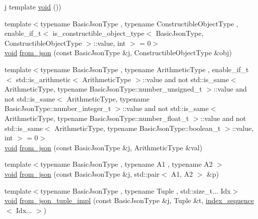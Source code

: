 \begin{DoxyCompactItemize}
\item 
j template \mbox{\hyperlink{namespacenlohmann_1_1detail_a59fca69799f6b9e366710cb9043aa77d}{void}} ())
\item 
{\footnotesize template$<$typename Basic\+Json\+Type , typename Constructible\+Object\+Type , enable\+\_\+if\+\_\+t$<$ is\+\_\+constructible\+\_\+object\+\_\+type$<$ Basic\+Json\+Type, Constructible\+Object\+Type $>$\+::value, int $>$  = 0$>$ }\\\mbox{\hyperlink{namespacenlohmann_1_1detail_a59fca69799f6b9e366710cb9043aa77d}{void}} \mbox{\hyperlink{namespacenlohmann_1_1detail_a5b24896e5f5db6af06d939dde4b63fe1}{from\+\_\+json}} (const Basic\+Json\+Type \&j, Constructible\+Object\+Type \&obj)
\item 
{\footnotesize template$<$typename Basic\+Json\+Type , typename Arithmetic\+Type , enable\+\_\+if\+\_\+t$<$ std\+::is\+\_\+arithmetic$<$ Arithmetic\+Type $>$\+::value and not std\+::is\+\_\+same$<$ Arithmetic\+Type, typename Basic\+Json\+Type\+::number\+\_\+unsigned\+\_\+t $>$\+::value and not std\+::is\+\_\+same$<$ Arithmetic\+Type, typename Basic\+Json\+Type\+::number\+\_\+integer\+\_\+t $>$\+::value and not std\+::is\+\_\+same$<$ Arithmetic\+Type, typename Basic\+Json\+Type\+::number\+\_\+float\+\_\+t $>$\+::value and not std\+::is\+\_\+same$<$ Arithmetic\+Type, typename Basic\+Json\+Type\+::boolean\+\_\+t $>$\+::value, int $>$  = 0$>$ }\\\mbox{\hyperlink{namespacenlohmann_1_1detail_a59fca69799f6b9e366710cb9043aa77d}{void}} \mbox{\hyperlink{namespacenlohmann_1_1detail_a839b0ab50d2c9bce669068f56bc41202}{from\+\_\+json}} (const Basic\+Json\+Type \&j, Arithmetic\+Type \&val)
\item 
{\footnotesize template$<$typename Basic\+Json\+Type , typename A1 , typename A2 $>$ }\\\mbox{\hyperlink{namespacenlohmann_1_1detail_a59fca69799f6b9e366710cb9043aa77d}{void}} \mbox{\hyperlink{namespacenlohmann_1_1detail_aae9f9c2601074e323d49428132cc293d}{from\+\_\+json}} (const Basic\+Json\+Type \&j, std\+::pair$<$ A1, A2 $>$ \&p)
\item 
{\footnotesize template$<$typename Basic\+Json\+Type , typename Tuple , std\+::size\+\_\+t... Idx$>$ }\\\mbox{\hyperlink{namespacenlohmann_1_1detail_a59fca69799f6b9e366710cb9043aa77d}{void}} \mbox{\hyperlink{namespacenlohmann_1_1detail_a28253915d9db4a0112d60eaee0422949}{from\+\_\+json\+\_\+tuple\+\_\+impl}} (const Basic\+Json\+Type \&j, Tuple \&t, \mbox{\hyperlink{structnlohmann_1_1detail_1_1index__sequence}{index\+\_\+sequence}}$<$ Idx... $>$)

\end{DoxyCompactItemize}
